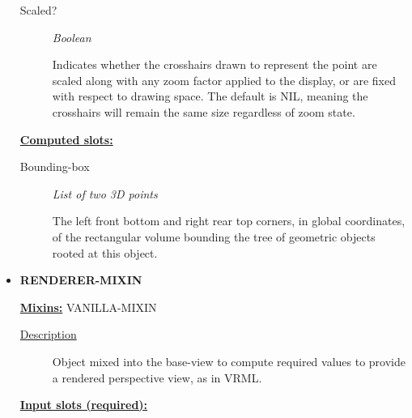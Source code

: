 \documentclass [11pt]{book}
\begin{document}
\begin{itemize}
\begin{description}
\item [Scaled?]
\emph{Boolean}

 Indicates whether the crosshairs drawn to represent the point are scaled along with
any zoom factor applied to the display, or are fixed with respect to drawing space. The default is NIL,
meaning the crosshairs will remain the same size regardless of zoom state.




\end{description}






\textbf{
\underline{Computed slots:}}

\begin{description}

\item [Bounding-box]
\emph{List of two 3D points}

 The left front bottom and right rear top corners, in global coordinates,
of the rectangular volume bounding the tree of geometric objects rooted at this object.




\end{description}







\item {}
\textbf{RENDERER-MIXIN}


\textbf{
\underline{Mixins:}} VANILLA-MIXIN





\begin{description}

\item [
\underline{Description}]


Object mixed into the base-view to compute required values to provide
a rendered perspective view, as in VRML.



\end{description}








\textbf{
\underline{Input slots (required):}}

\begin{description}


\end{description}
\end{itemize}
\end{document}
